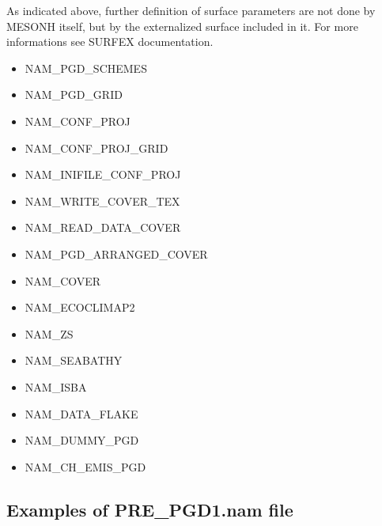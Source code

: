 As indicated above, further definition of surface parameters are not done by MESONH itself, but by the externalized surface included in it. For more informations see SURFEX documentation.\\

\begin{itemize}
\item NAM\_PGD\_SCHEMES
\item NAM\_PGD\_GRID
\item NAM\_CONF\_PROJ
\item NAM\_CONF\_PROJ\_GRID
\item NAM\_INIFILE\_CONF\_PROJ
\item NAM\_WRITE\_COVER\_TEX
\item NAM\_READ\_DATA\_COVER
\item NAM\_PGD\_ARRANGED\_COVER
\item NAM\_COVER
\item NAM\_ECOCLIMAP2
\item NAM\_ZS
\item NAM\_SEABATHY
\item NAM\_ISBA
\item NAM\_DATA\_FLAKE
\item NAM\_DUMMY\_PGD
\item NAM\_CH\_EMIS\_PGD
\end{itemize}

\subsection{Examples of PRE\_PGD1.nam file \label{example}}

